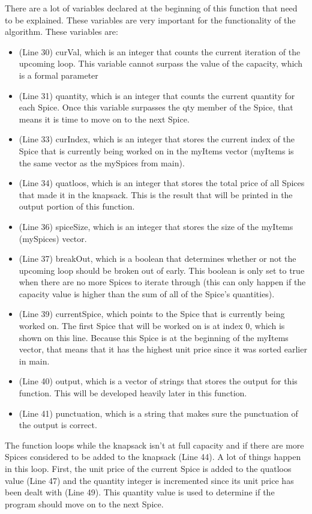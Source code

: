 \documentclass[letterpaper, 10pt]{article}
\begin{document}
\noindent
There are a lot of variables declared at the beginning of this function that need to be explained. These variables are very important for the functionality of the algorithm. These variables are:
\begin{itemize}
    \item (Line 30) curVal, which is an integer that counts the current iteration of the upcoming loop. This variable cannot surpass the value of the capacity, which is a formal parameter
    \item (Line 31) quantity, which is an integer that counts the current quantity for each Spice. Once this variable surpasses the qty member of the Spice, that means it is time to move on to the next Spice.
    \item (Line 33) curIndex, which is an integer that stores the current index of the Spice that is currently being worked on in the myItems vector (myItems is the same vector as the mySpices from main).
    \item (Line 34) quatloos, which is an integer that stores the total price of all Spices that made it in the knapsack. This is the result that will be printed in the output portion of this function.
    \item (Line 36) spiceSize, which is an integer that stores the size of the myItems (mySpices) vector.
    \item (Line 37) breakOut, which is a boolean that determines whether or not the upcoming loop should be broken out of early. This boolean is only set to true when there are no more Spices to iterate through (this can only happen if the capacity value is higher than the sum of all of the Spice's quantities).
    \item (Line 39) currentSpice, which points to the Spice that is currently being worked on. The first Spice that will be worked on is at index 0, which is shown on this line. Because this Spice is at the beginning of the myItems vector, that means that it has the highest unit price since it was sorted earlier in main.
    \item (Line 40) output, which is a vector of strings that stores the output for this function. This will be developed heavily later in this function.
    \item (Line 41) punctuation, which is a string that makes sure the punctuation of the output is correct.
\end{itemize}

\noindent
The function loops while the knapsack isn't at full capacity and if there are more Spices considered to be added to the knapsack (Line 44). A lot of things happen in this loop. First, the unit price of the current Spice is added to the quatloos value (Line 47) and the quantity integer is incremented since its unit price has been dealt with (Line 49). This quantity value is used to determine if the program should move on to the next Spice. 
\end{document}

